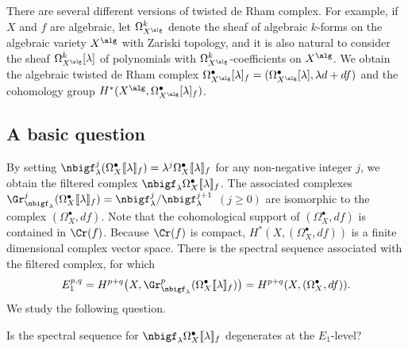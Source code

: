 \documentclass[a4,10pt]{article}
\begin{document}
There are several different versions of
twisted de Rham complex.
For example,
if $X$ and $f$ are algebraic,
let $\Omega^{k}_{X^{\alg}}$ denote the sheaf of
algebraic $k$-forms
on the algebraic variety $X^{\alg}$
with Zariski topology,
and 
it is also natural to consider
the sheaf 
$\Omega_{X^{\alg}}^k[\lambda]$
of polynomials
with $\Omega_{X^{\alg}}^k$-coefficients
on $X^{\alg}$.
We obtain the algebraic twisted de Rham complex
$\Omega^{\bullet}_{X^{\alg}}[\lambda]_f=
(\Omega^{\bullet}_{X^{\alg}}[\lambda],\lambda d+df)$
and the cohomology group
$H^{\ast}(X^{\alg},\Omega^{\bullet}_{X^{\alg}}[\lambda]_f)$.

\subsection{A basic question}

By setting 
$\nbigf_{\lambda}^j(\Omega^{\bullet}_X[\![\lambda]\!]_f)
=\lambda^j\Omega^{\bullet}_X[\![\lambda]\!]_f$
for any non-negative integer $j$,
we obtain the filtered complex
$\nbigf_{\lambda}\Omega^{\bullet}_X[\![\lambda]\!]_f$.
The associated complexes
$\Gr^j_{\nbigf_{\lambda}}(\Omega^{\bullet}_X[\![\lambda]\!]_f)
=\nbigf_{\lambda}^j/\nbigf_{\lambda}^{j+1}$ $(j\geq 0)$
are isomorphic to
the complex $(\Omega^{\bullet}_X,df)$.
Note that the cohomological support of
$(\Omega^{\bullet}_X,df)$ is contained in $\Cr(f)$.
Because $\Cr(f)$ is compact,
$H^{\ast}(X,(\Omega^{\bullet}_X,df))$ is
a finite dimensional complex vector space.
There is the spectral sequence
associated with the filtered complex,
for which 
\[
E_1^{p,q}=
H^{p+q}\bigl(X,
\Gr^{p}_{\nbigf_{\lambda}}
(\Omega^{\bullet}_X[\![\lambda]\!]_f)
\bigr)
=H^{p+q}(X,(\Omega_X^{\bullet},df)).
\]
We study the following question.

\begin{question}
\label{question;25.6.26.1}
Is the spectral sequence
for $\nbigf_{\lambda}\Omega^{\bullet}_X[\![\lambda]\!]_f$
degenerates
at the $E_1$-level?
\end{question}
\end{document}
